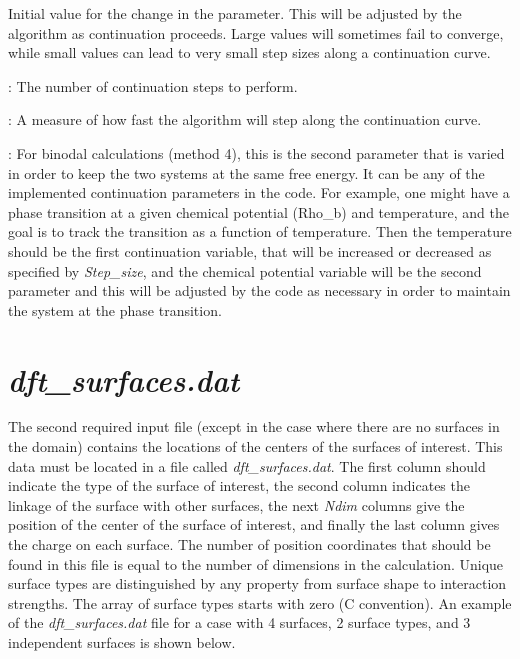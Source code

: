 \documentclass[10pt,onecolumn]{article}
\begin{document}
\vspace{0.1in}
Initial value for the change in the parameter.  This will be adjusted by the algorithm as continuation proceeds.  Large values will sometimes fail to converge, while small values can lead to very small step sizes along a continuation curve.

\vspace{0.1in}
:
The number of continuation steps to perform.

\vspace{0.1in}
: 
A measure of how fast the algorithm will step along the continuation curve.

\vspace{0.1in}
:
For binodal calculations (method 4), this is the second parameter that is varied in order to keep the two systems at the same free energy.  It can be any of the implemented continuation parameters in the code.   For example, one might have a phase transition at a given chemical potential (Rho\_b) and temperature, and the goal is to track the transition as a function of temperature.  Then the temperature should be the first continuation variable, that will be increased or decreased as specified by {\it Step\_size}, and the chemical potential variable will be the second parameter and this will be adjusted by the code as necessary in order to maintain the system at the phase transition.



\vfill
\break

\section{{\it dft\_surfaces.dat}}
\label{sec:surfaces}
The second required input file (except in the case where there are no surfaces in the domain) contains the
locations of the centers of the surfaces of interest.  This data must be
located in a file called {\it dft\_surfaces.dat}.  The first column should
indicate the type of the surface of interest, the second column indicates
the linkage of the surface with other surfaces, the next {\it Ndim} columns give
the position of the center of the surface of interest, and finally the last column gives
the charge on each surface.  The number of position
coordinates that should be found in this file is equal to the number
of dimensions in the calculation.  Unique surface types are distinguished
by any property from surface shape to interaction strengths.  The array of
surface types starts with zero (C convention).  An example of
the {\it dft\_surfaces.dat} file for a case with 4 surfaces, 2 surface
types, and 3 independent surfaces is shown below.
\end{document}
